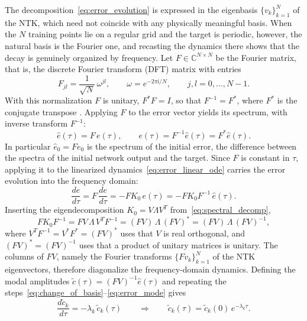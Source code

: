The decomposition~\eqref{eq:error_evolution} is expressed in the eigenbasis $\{v_k\}_{k=1}^{N}$ of the NTK, which need not coincide with any physically meaningful basis. When the $N$ training points lie on a regular grid and the target is periodic, however, the natural basis is the Fourier one, and recasting the dynamics there shows that the decay is genuinely organized by frequency. Let $F \in \mathbb{C}^{N \times N}$ be the Fourier matrix, that is, the discrete Fourier transform (DFT) matrix with entries
\begin{equation*}
    F_{jl} = \frac{1}{\sqrt{N}}\,\omega^{jl}, \qquad \omega = e^{-2\pi \mathrm{i}/N}, \qquad j,l = 0,\ldots,N-1.
\end{equation*}
With this normalization $F$ is unitary, $F^{*}F = I$, so that $F^{-1} = F^{*}$, where $F^{*}$ is the conjugate transpose \parencite{golub2013, strang2006}. Applying $F$ to the error vector yields its spectrum, with inverse transform $F^{-1}$:
\begin{equation}\label{eq:dft_error}
    \hat e(\tau) = F\,e(\tau), \qquad e(\tau) = F^{-1}\hat e(\tau) = F^{*}\hat e(\tau).
\end{equation}
In particular $\hat e_0 = F e_0$ is the spectrum of the initial error, the difference between the spectra of the initial network output and the target. Since $F$ is constant in $\tau$, applying it to the linearized dynamics~\eqref{eq:error_linear_ode} carries the error evolution into the frequency domain:
\begin{equation*}
    \frac{d\hat e}{d\tau}
    = F\,\frac{de}{d\tau}
    = -F K_0\,e(\tau)
    = -F K_0 F^{-1}\,\hat e(\tau).
\end{equation*}
Inserting the eigendecomposition $K_0 = V\Lambda V^T$ from~\eqref{eq:spectral_decomp},
\begin{equation*}
    F K_0 F^{-1}
    = F V\,\Lambda\,V^T F^{-1}
    = (FV)\,\Lambda\,(FV)^{*}
    = (FV)\,\Lambda\,(FV)^{-1},
\end{equation*}
where $V^T F^{-1} = V^{*} F^{*} = (FV)^{*}$ uses that $V$ is real orthogonal, and $(FV)^{*} = (FV)^{-1}$ uses that a product of unitary matrices is unitary. The columns of $FV$, namely the Fourier transforms $\{F v_k\}_{k=1}^{N}$ of the NTK eigenvectors, therefore diagonalize the frequency-domain dynamics. Defining the modal amplitudes $\tilde c(\tau) = (FV)^{-1}\hat e(\tau)$ and repeating the steps~\eqref{eq:change_of_basis}--\eqref{eq:error_mode} gives
\begin{equation}\label{eq:fourier_mode}
    \frac{d\tilde c_k}{d\tau} = -\lambda_k\,\tilde c_k(\tau)
    \qquad\Longrightarrow\qquad
    \tilde c_k(\tau) = \tilde c_k(0)\,e^{-\lambda_k\tau}.
\end{equation}
